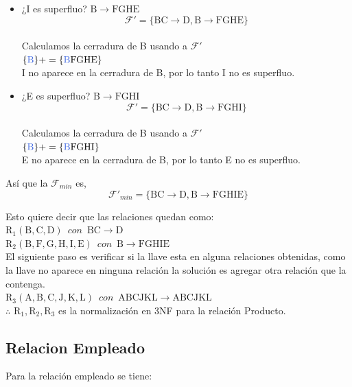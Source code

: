 \documentclass[10pt]{article}
\begin{document}
\begin{itemize}
	\item ¿I es superfluo? $\mathrm{B \rightarrow FGHE}$ \\
	$$\mathcal{F}'=\mathrm{\{ BC \rightarrow D, B \rightarrow FGHE \}}$$\\
	Calculamos la cerradura de B usando a $\mathcal{F}'$\\
	$\mathrm{\{\textcolor{RoyalBlue}{B}\}+= \{\textcolor{RoyalBlue}{B}FGHE\}}$\\
	
	I no aparece en la cerradura de B, por lo tanto I no es superfluo.
	
	\item ¿E es superfluo? $\mathrm{B \rightarrow FGHI}$ \\
	$$\mathcal{F}'=\mathrm{\{ BC \rightarrow D, B \rightarrow FGHI \}}$$\\
	Calculamos la cerradura de B usando a $\mathcal{F}'$\\
	$\mathrm{\{\textcolor{RoyalBlue}{B}\}+= \{\textcolor{RoyalBlue}{B}FGHI\}}$\\
	
	E no aparece en la cerradura de B, por lo tanto E no es superfluo.\\
	
\end{itemize}	
	Así que la $\mathcal{F}_{min}$ es,\\
	
	$$\mathcal{F}'_{min}= \mathrm{\{ BC \rightarrow D, B \rightarrow FGHIE \}}$$
	
	Esto quiere decir que las relaciones quedan como: \\
	
	$\mathrm{R_1(B,C,D)}\,\,\, con \,\,\, \mathrm{ BC \rightarrow D}$\\
	$\mathrm{R_2(B,F, G, H, I, E)}\,\,\, con \,\,\, \mathrm{ B \rightarrow FGHIE}$\\
	
	El siguiente paso es verificar si la llave esta en alguna relaciones obtenidas, como la llave no aparece en ninguna relación la solución es agregar otra relación que la contenga.\\
	
	
	$\mathrm{R_3(A,B,C,J,K,L)}\,\,\, con \,\,\, \mathrm{ ABCJKL \rightarrow ABCJKL}$\\


   $\therefore \,\, \mathrm{R_1, R_2, R_3} $  es la normalización en 3NF para la relación Producto. 
   
   
   \subsection{Relacion Empleado}
   Para la relación empleado se tiene:\\
   
\end{document}
